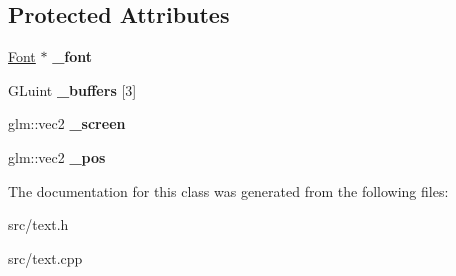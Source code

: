 \subsection*{Protected Attributes}
\begin{DoxyCompactItemize}
\item 
\hypertarget{class_text_a8c902f985ee14e1ea4bfb5ff62f2d249}{}\hyperlink{class_font}{Font} $\ast$ {\bfseries \+\_\+font}\label{class_text_a8c902f985ee14e1ea4bfb5ff62f2d249}

\item 
\hypertarget{class_text_aa7182632b7555d834ccab02387ce8a22}{}G\+Luint {\bfseries \+\_\+buffers} \mbox{[}3\mbox{]}\label{class_text_aa7182632b7555d834ccab02387ce8a22}

\item 
\hypertarget{class_text_a8c4ad6de5b87e93c16bc50f6e65191e8}{}glm\+::vec2 {\bfseries \+\_\+screen}\label{class_text_a8c4ad6de5b87e93c16bc50f6e65191e8}

\item 
\hypertarget{class_text_adf2f5062284b46c3dcd66e81835d493e}{}glm\+::vec2 {\bfseries \+\_\+pos}\label{class_text_adf2f5062284b46c3dcd66e81835d493e}

\end{DoxyCompactItemize}


The documentation for this class was generated from the following files\+:\begin{DoxyCompactItemize}
\item 
src/text.\+h\item 
src/text.\+cpp\end{DoxyCompactItemize}
